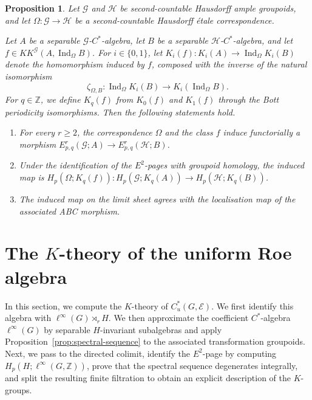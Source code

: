 \documentclass[pdflatex,sn-mathphys-num]{sn-jnl}%
\theoremstyle{plain}
\newtheorem{proposition}[theorem]{Proposition}
\theoremstyle{remark}
\theoremstyle{definition}
\numberwithin{equation}{section}
\begin{document}
\begin{proposition}
\label{prop:miller-functoriality}
Let \( \mathcal G \) and \( \mathcal H \) be second-countable Hausdorff ample groupoids, and let \( \Omega \colon \mathcal G \to \mathcal H \) be a second-countable Hausdorff \'{e}tale correspondence.

Let \( A \) be a separable \( \mathcal G \)-\( C^* \)-algebra, let \( B \) be a separable \( \mathcal H \)-\( C^* \)-algebra, and let \( f\in KK^{\mathcal G}(A,\operatorname{Ind}_{\Omega}B) \). For \( i\in\{0,1\} \), let \( K_i(f)\colon K_i(A)\longrightarrow\operatorname{Ind}_{\Omega}K_i(B) \) denote the homomorphism induced by \( f \), composed with the inverse of the natural isomorphism
\[
\zeta_{\Omega,B}\colon
\operatorname{Ind}_{\Omega}K_i(B)
\longrightarrow
K_i(\operatorname{Ind}_{\Omega}B).
\]
For \( q\in\mathbb Z \), we define \( K_q(f) \) from \( K_0(f) \) and \( K_1(f) \) through the Bott periodicity isomorphisms. Then the following statements hold.
\begin{enumerate}
\item For every \( r\ge2 \), the correspondence \( \Omega \) and the class \( f \) induce functorially a morphism \( E^r_{p,q}(\mathcal G;A)\to E^r_{p,q}(\mathcal H;B) \).

\item Under the identification of the \( E^2 \)-pages with groupoid homology, the induced map is \( H_p(\Omega;K_q(f))\colon H_p(\mathcal G;K_q(A))\to H_p(\mathcal H;K_q(B)) \).

\item The induced map on the limit sheet agrees with the localisation map of the associated ABC morphism.
\end{enumerate}
\end{proposition}

\section{\texorpdfstring{The \( K \)-theory of the uniform Roe algebra}{The K-theory of the uniform Roe algebra}}
\label{sec:uniform-roe-k-theory}


In this section, we compute the \( K \)-theory of \( C_u^*(G,\mathcal E) \). We first identify this algebra with \( \ell^\infty(G)\rtimes_rH \). We then approximate the coefficient \( C^* \)-algebra \( \ell^\infty(G) \) by separable \( H \)-invariant subalgebras and apply Proposition~\ref{prop:spectral-sequence} to the associated transformation groupoids. Next, we pass to the directed colimit, identify the \( E^2 \)-page by computing \( H_p(H;\ell^\infty(G,\mathbb Z)) \), prove that the spectral sequence degenerates integrally, and split the resulting finite filtration to obtain an explicit description of the \( K \)-groups.
\end{document}
